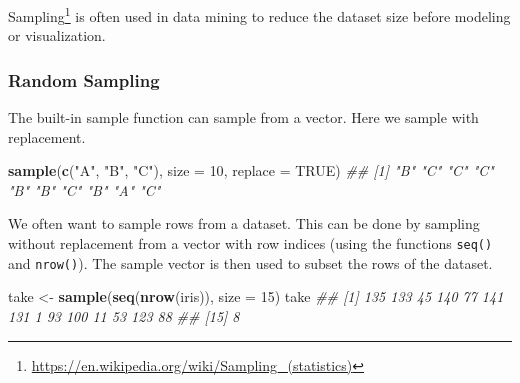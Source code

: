 \documentclass[
  notitlepage]{book}
\newenvironment{Shaded}{\begin{snugshade}}{\end{snugshade}}
\newcommand{\CommentTok}[1]{\textcolor[rgb]{0.56,0.35,0.01}{\textit{#1}}}
\newcommand{\DataTypeTok}[1]{\textcolor[rgb]{0.13,0.29,0.53}{#1}}
\newcommand{\DecValTok}[1]{\textcolor[rgb]{0.00,0.00,0.81}{#1}}
\newcommand{\KeywordTok}[1]{\textcolor[rgb]{0.13,0.29,0.53}{\textbf{#1}}}
\newcommand{\NormalTok}[1]{#1}
\newcommand{\OtherTok}[1]{\textcolor[rgb]{0.56,0.35,0.01}{#1}}
\newcommand{\StringTok}[1]{\textcolor[rgb]{0.31,0.60,0.02}{#1}}
\DeclareRobustCommand{\href}[2]{#2\footnote{\url{#1}}}
\begin{document}
\href{https://en.wikipedia.org/wiki/Sampling_(statistics)}{Sampling} is often
used in data mining to reduce the dataset size before modeling or
visualization.

\hypertarget{random-sampling}{%
\subsubsection{Random Sampling}\label{random-sampling}}

The built-in sample function can sample from a vector. Here we sample
with replacement.

\begin{Shaded}
\begin{Highlighting}[]
\KeywordTok{sample}\NormalTok{(}\KeywordTok{c}\NormalTok{(}\StringTok{"A"}\NormalTok{, }\StringTok{"B"}\NormalTok{, }\StringTok{"C"}\NormalTok{), }\DataTypeTok{size =} \DecValTok{10}\NormalTok{, }\DataTypeTok{replace =} \OtherTok{TRUE}\NormalTok{)}
\CommentTok{\#\#  [1] "B" "C" "C" "C" "B" "B" "C" "B" "A" "C"}
\end{Highlighting}
\end{Shaded}

We often want to sample rows from a dataset. This can be done by
sampling without replacement from a vector with row indices (using the
functions \texttt{seq()} and \texttt{nrow()}). The sample vector is then used to
subset the rows of the dataset.

\begin{Shaded}
\begin{Highlighting}[]
\NormalTok{take \textless{}{-}}\StringTok{ }\KeywordTok{sample}\NormalTok{(}\KeywordTok{seq}\NormalTok{(}\KeywordTok{nrow}\NormalTok{(iris)), }\DataTypeTok{size =} \DecValTok{15}\NormalTok{)}
\NormalTok{take}
\CommentTok{\#\#  [1] 135 133  45 140  77 141 131   1  93 100  11  53 123  88}
\CommentTok{\#\# [15]   8}
\end{Highlighting}
\end{Shaded}
\end{document}
